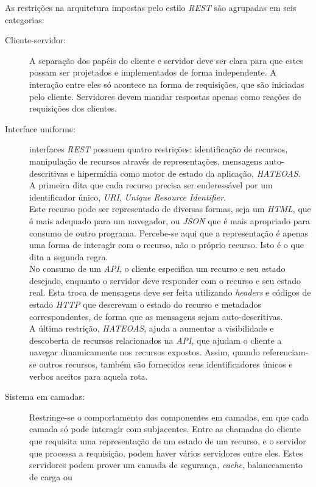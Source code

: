 As restrições na arquitetura impostas pelo estilo \emph{REST} são agrupadas em seis categorias:
\begin{description}
\item[Cliente-servidor:] A separação dos papéis do cliente e servidor deve ser clara para 
  que estes possam ser projetados e implementados de forma independente. A interação 
  entre eles só acontece na forma de requisições, que são iniciadas pelo cliente. 
  Servidores devem mandar respostas apenas como reações de requisições dos clientes.
\item[Interface uniforme:] interfaces \emph{REST} possuem quatro  restrições:
identificação de recursos, manipulação de recursos através de representações, 
mensagens auto-descritivas e hipermídia como motor de estado da aplicação, \emph{HATEOAS}.\\
A primeira dita que cada recurso precisa ser enderessável 
por um identificador único, \emph{URI}, \emph{Unique Resource Identifier}.\\
Este 
recurso pode ser representado de diversas formas, seja um \emph{HTML}, que é mais adequado para 
um navegador,
ou \emph{JSON} que é mais apropriado para consumo de outro programa. Percebe-se aqui 
que a representação é apenas uma forma de interagir com o 
recurso,  não o próprio recurso. Isto é o que dita a segunda regra. \\
No consumo de um \emph{API}, o cliente especifica um recurso e seu estado 
desejado, enquanto o servidor deve responder com o recurso e seu estado real. 
Esta troca de mensagens  deve ser feita utilizando \emph{headers} e 
códigos de estado \emph{HTTP} que descrevam o estado 
do recurso e metadados correspondentes, de forma que as mensagens sejam auto-descritivas.\\
A última restrição, \emph{HATEOAS}, ajuda a aumentar a visibilidade e descoberta de recursos 
relacionados na \emph{API}, que ajudam o cliente a navegar dinamicamente nos recursos expostos.
Assim, quando referenciam-se outros recursos, também são fornecidos seus identificadores únicos 
e verbos aceitos para aquela rota.
\item[Sistema em camadas:] Restringe-se o comportamento dos componentes em camadas, em que 
  cada camada só pode interagir com subjacentes. 
  Entre as chamadas do cliente que requisita uma representação de um estado de um recurso, e 
  o servidor que processa a requisição, podem haver vários servidores entre eles. Estes 
  servidores podem prover um camada de segurança, \emph{cache}, balanceamento de carga ou 

\end{description}
